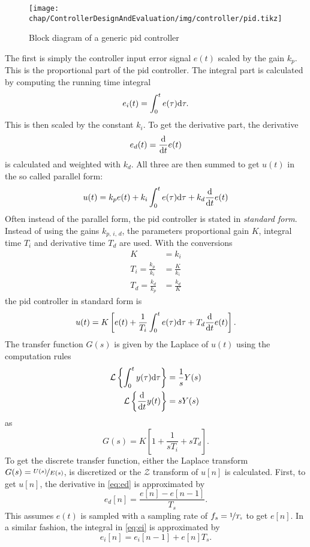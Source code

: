 \begin{figure}[tb]
	\centering
	\texttt{[image: chap/ControllerDesignAndEvaluation/img/controller/pid.tikz]}
	\caption{Block diagram of a generic \gls{pid} controller}
	\label{fig:controllerDesignAndEvaluation-genericPID}
\end{figure}
The first is simply the controller input error signal $e(t)$ scaled by the gain $k_p$. This is the proportional part of the \gls{pid} controller. The integral part is calculated by computing the running time integral
\begin{equation}\label{eq:ei}
e_i(t)=\int_{0}^{t} e(\tau) \text{d}{\tau}.
\end{equation}
This is then scaled by the constant $k_i$. To get the derivative part, the derivative
\begin{equation}\label{eq:ed}
e_d(t)=\frac{\text{d}{}}{\text{d}{t}} e(t)
\end{equation}
is calculated and weighted with $k_d$.
All three are then summed to get $u(t)$ in the so called parallel form\cite[p.~5]{Dodds2015}:
\begin{equation}
u(t)=k_p e(t) + k_i \int_{0}^{t} e(\tau) \text{d}{\tau} + k_d \frac{\text{d}{}}{\text{d}{t}} e(t)
\end{equation}
Often instead of the parallel form, the \gls{pid} controller is stated in \textit{standard form}. Instead of using the gains $k_{p,\,i,\,d}$, the parameters proportional gain $K$, integral time $T_i$ and derivative time $T_d$ are used.\cite[p.~76]{Aastroem1995} With the conversions
\begin{align}
K&=k_i\\
T_i=\frac{k_p}{k_i}&=\frac{K}{k_i}\\
T_d=\frac{k_d}{k_p}&=\frac{k_d}{K}
\end{align}
the \gls{pid} controller in standard form is
\begin{equation}
u(t)=K\left[e(t) + \frac{1}{T_i} \int_{0}^{t} e(\tau) \text{d}{\tau} + T_d \frac{\text{d}{}}{\text{d}{t}} e(t)\right].
\end{equation}
The transfer function $G(s)$ is given by the Laplace of $u(t)$ using the computation rules\cite{Leon2015}
\begin{align}
\mathcal{L}\left\{\int_{0}^{t} y(\tau) \text{d}{\tau}\right\} &= \frac{1}{s} Y(s)\\
\mathcal{L}\left\{\frac{\text{d}{}}{\text{d}{t}} y(t)\right\} &= s Y(s)
\end{align}
as
\begin{equation}
G(s)=K\left[1+\frac{1}{s T_i}+s T_d\right].
\end{equation}
To get the discrete transfer function, either the Laplace transform $G(s)=\nicefrac{U(s)}{E(s)}$, is discretized or the $\mathcal{Z}$ transform of $u[n]$ is calculated.
First, to get $u[n]$, the derivative in \autoref{eq:ed} is approximated by
\begin{equation}
e_d[n]=\frac{e[n]-e[n-1]}{T_s}.
\end{equation}
This assumes $e(t)$ is sampled with a sampling rate of $f_s=\nicefrac{1}{T_s}$ to get $e[n]$. In a similar fashion, the integral in \autoref{eq:ei} is approximated by
\begin{equation}
e_i[n]=e_i[n-1] + e[n] T_s.
\end{equation}

